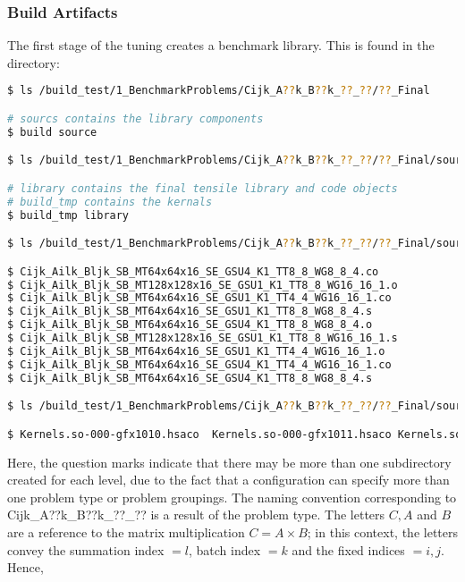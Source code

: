 \documentclass[]{article}
\begin{document}
\subsubsection{Build Artifacts}
\label{sec:einstein}

\noindent
The first stage of the tuning creates a benchmark library. This is found in the directory:

\begin{lstlisting}[language=bash,breaklines=true, emph={build,ls,build_tmp,library}, emphstyle=\color{blue}]
$ ls /build_test/1_BenchmarkProblems/Cijk_A??k_B??k_??_??/??_Final

# sourcs contains the library components
$ build source

$ ls /build_test/1_BenchmarkProblems/Cijk_A??k_B??k_??_??/??_Final/source

# library contains the final tensile library and code objects
# build_tmp contains the kernals
$ build_tmp library

$ ls /build_test/1_BenchmarkProblems/Cijk_A??k_B??k_??_??/??_Final/source/build_tmp/SOURCETMP/assembly

$ Cijk_Ailk_Bljk_SB_MT64x64x16_SE_GSU4_K1_TT8_8_WG8_8_4.co
$ Cijk_Ailk_Bljk_SB_MT128x128x16_SE_GSU1_K1_TT8_8_WG16_16_1.o
$ Cijk_Ailk_Bljk_SB_MT64x64x16_SE_GSU1_K1_TT4_4_WG16_16_1.co
$ Cijk_Ailk_Bljk_SB_MT64x64x16_SE_GSU1_K1_TT8_8_WG8_8_4.s
$ Cijk_Ailk_Bljk_SB_MT64x64x16_SE_GSU4_K1_TT8_8_WG8_8_4.o
$ Cijk_Ailk_Bljk_SB_MT128x128x16_SE_GSU1_K1_TT8_8_WG16_16_1.s
$ Cijk_Ailk_Bljk_SB_MT64x64x16_SE_GSU1_K1_TT4_4_WG16_16_1.o
$ Cijk_Ailk_Bljk_SB_MT64x64x16_SE_GSU4_K1_TT4_4_WG16_16_1.co
$ Cijk_Ailk_Bljk_SB_MT64x64x16_SE_GSU4_K1_TT8_8_WG8_8_4.s

$ ls /build_test/1_BenchmarkProblems/Cijk_A??k_B??k_??_??/??_Final/source/library

$ Kernels.so-000-gfx1010.hsaco  Kernels.so-000-gfx1011.hsaco Kernels.so-000-gfx803.hsaco Kernels.so-000-gfx900.hsaco Kernels.so-000-gfx906.hsaco  Kernels.so-000-gfx908.hsaco TensileLibrary_gfx906.co TensileLibrary.yaml

\end{lstlisting}

\noindent
Here, the question marks indicate that there may be more than one subdirectory created for each level, due to the fact that a configuration can specify more than one problem type or problem groupings. The naming convention corresponding to Cijk\_A??k\_B??k\_??\_?? is a result of the problem type. The letters $ C, A $ and $ B $ are a reference to the matrix multiplication $ C = A \times B $; in this context, the letters convey the summation index $= l$, batch index $= k$ and the fixed indices $=i,j$. Hence,
\end{document}
